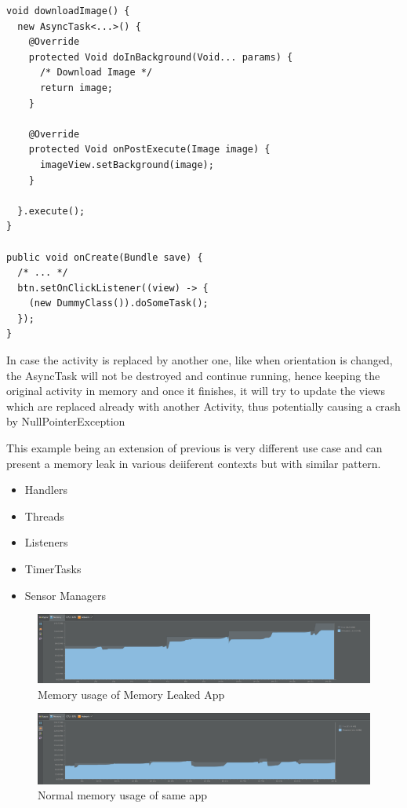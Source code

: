 \documentclass[journal]{IEEEtran}
\begin{document}
\begin{itemize}
	\newpage
\begin{verbatim}
void downloadImage() {
  new AsyncTask<...>() {
    @Override
    protected Void doInBackground(Void... params) {
      /* Download Image */
      return image;
    }
    
    @Override
    protected Void onPostExecute(Image image) {
      imageView.setBackground(image);
    }
    
  }.execute();
}

public void onCreate(Bundle save) {
  /* ... */
  btn.setOnClickListener((view) -> {
    (new DummyClass()).doSomeTask();
  });
}
\end{verbatim}
	In case the activity is replaced by another one, like when orientation is changed, the AsyncTask will not be destroyed and continue running, hence keeping the original activity in memory and once it finishes, it will try to update the views which are replaced already with another Activity, thus potentially causing a crash by NullPointerException
	
	This example being an extension of previous is very different use case and can present a memory leak in various deiiferent contexts but with similar pattern.
	\begin{itemize}
		\item Handlers
		\item Threads
		\item Listeners
		\item TimerTasks
		\item Sensor Managers\\
	\end{itemize}
	

\end{itemize}

\begin{figure}[h]
	\centering
	\includegraphics[width=0.7\linewidth]{memleak}
	\caption[]{Memory usage of Memory Leaked App \cite{fixing}}
	\label{fig:memleak}
\end{figure}

\begin{figure}[h]
	\centering
	\includegraphics[width=0.7\linewidth]{nomemleak}
	\caption[]{Normal memory usage of same app \cite{fixing}}
	\label{fig:nomemleak}
\end{figure}
\end{document}
